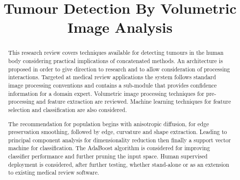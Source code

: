 \documentclass[journal]{IEEEtran}
\begin{document}
\title{Tumour Detection By Volumetric Image Analysis}
\author{
}


{}

\maketitle





\begin{abstract}

This research review covers techniques available for detecting tumours in the human body considering practical implications of concatenated methods.   
An architecture is proposed in order to give direction to research and to allow consideration of processing interactions.
Targeted at medical review applications the system follows standard image processing conventions and contains a sub-module that provides confidence information for a domain expert.  
Volumetric image processing techniques for pre-processing and feature extraction are reviewed. 
Machine learning techniques for feature selection and classification are also considered. 

The recommendation for population begins with anisotropic diffusion, for edge preservation smoothing, followed by edge, curvature and shape extraction.
Leading to principal component analysis for dimensionality reduction then finally a support vector machine for classification.
The AdaBoost algorithm is considered for improving classifier performance and further pruning the input space.
Human supervised deployment is considered, after further testing, whether stand-alone or as an extension to existing medical review software.

\end{abstract}










\IEEEpeerreviewmaketitle
\end{document}
